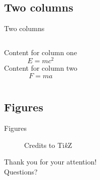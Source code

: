 \documentclass[
10pt,
aspectratio=169,
]{beamer}
\begin{document}
\subsection{Two columns}
\begin{frame}[c]{Two columns}
	
\begin{columns}[onlytextwidth]
	Content for column one
	\begin{equation}
	E = mc^2
	\end{equation}
	Content for column two
	\begin{equation}
	F=ma
	\end{equation}
\end{columns}
	
\end{frame}	

\subsection{Figures}
\begin{frame}[c]{Figures}
	\begin{figure}
		\centering
		\caption{Credits to Ti\textit{k}Z}
	\end{figure}
\end{frame}	


\begin{frame}[plain]
	\vfill
	\centering
	{
		\centering \Huge \color{white} Thank you for your attention!\\[10pt]Questions?
	}
	\vfill
\end{frame}
\end{document}
